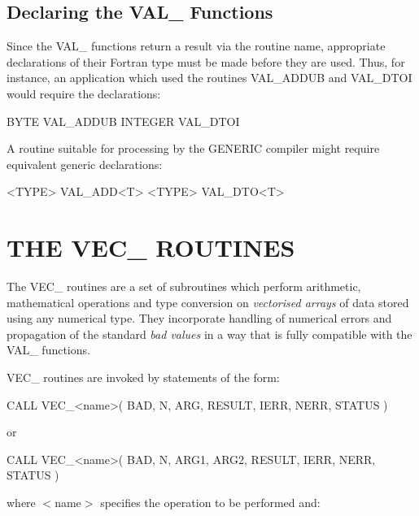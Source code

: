 \documentclass[11pt,nolof]{starlink}
\providecommand{\name}[1]{\mbox{#1}}
\begin{document}
\subsection{Declaring the \name{VAL\_} Functions}

Since the \name{VAL\_} functions return a result via the routine name,
appropriate declarations of their Fortran type must be made before they are
used.
Thus, for instance, an application which used the routines \name{VAL\_ADDUB}
and \name{VAL\_DTOI} would require the declarations:

\begin{terminalv}
BYTE VAL_ADDUB
INTEGER VAL_DTOI
\end{terminalv}

A routine suitable for processing by the \name{GENERIC} compiler might
require equivalent generic declarations:

\begin{terminalv}
<TYPE> VAL_ADD<T>
<TYPE> VAL_DTO<T>
\end{terminalv}

\section{THE \name{VEC\_} ROUTINES}

\label{section:vec}

The \name{VEC\_} routines are a set of subroutines which perform arithmetic,
mathematical operations and type conversion on \emph{vectorised arrays} of
data stored using any numerical type.
They incorporate handling of numerical errors and propagation of the
standard \emph{bad values} in a way that is fully compatible with the
\name{VAL\_} functions.

\name{VEC\_} routines are invoked by statements of the form:

\begin{terminalv}
CALL VEC_<name>( BAD, N, ARG, RESULT, IERR, NERR, STATUS )
\end{terminalv}
or
\begin{terminalv}
CALL VEC_<name>( BAD, N, ARG1, ARG2, RESULT, IERR, NERR, STATUS )
\end{terminalv}

where \name{$<$name$>$} specifies the operation to be performed and:
\end{document}
